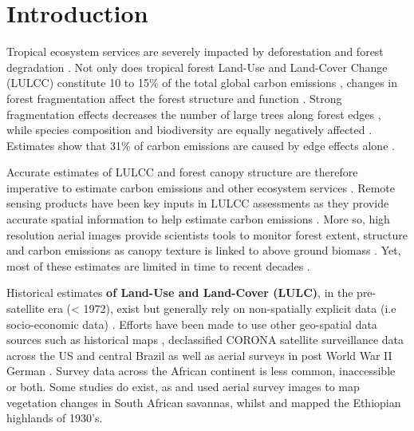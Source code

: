 \documentclass[remote sensing,article,submit,moreauthors,pdftex]{mdpi}
\begin{document}

\hypertarget{introduction}{%
\section{Introduction}\label{introduction}}

Tropical ecosystem services are severely impacted by deforestation and
forest degradation \citep{hansen2013, houghton2012, tyukavina2015}. Not
only does tropical forest Land-Use and Land-Cover Change (LULCC)
constitute 10 to 15\% of the total global carbon emissions
\citep{vanderwerf2009}, changes in forest fragmentation affect the
forest structure and function
\citep{fauset2017, brinck2017, didham1999}. Strong fragmentation effects
decreases the number of large trees along forest edges
\citep{laurance2000, magnago2015}, while species composition and
biodiversity are equally negatively affected
\citep{poorter2006, barlow2016, vandeperre2018}. Estimates show that
31\% of carbon emissions are caused by edge effects alone
\citep{brinck2017}.

Accurate estimates of LULCC and forest canopy structure are therefore
imperative to estimate carbon emissions and other ecosystem services
\citep{houghton2012, hansen2013}. Remote sensing products have been key
inputs in LULCC assessments as they provide accurate spatial information
to help estimate carbon emissions \citep{mitchard2018, hansen2013}. More
so, high resolution aerial images provide scientists tools to monitor
forest extent, structure and carbon emissions as canopy texture is
linked to above ground biomass
\citep{Ploton2012, Couteron2005, Barbier2010}. Yet, most of these
estimates are limited in time to recent decades
\citep{defries2002, houghton2012, hansen2013, achard2014}.

Historical estimates \textbf{of Land-Use and Land-Cover (LULC)}, in the
pre-satellite era (\textless{} 1972), exist but generally rely on
non-spatially explicit data (i.e socio-economic data)
\citep{houghton2012, ramankutty1999, defries2002, sader1988}. Efforts
have been made to use other geo-spatial data sources such as historical
maps \citep{willcock2016}, declassified CORONA satellite surveillance
data across the US and central Brazil \citep{song2015} as well as aerial
surveys in post World War II German \citep{nita2018}. Survey data across
the African continent is less common, inaccessible or both. Some studies
do exist, as \citet{buitenwerf2012} and \citet{hudak1998} used aerial
survey images to map vegetation changes in South African savannas,
whilst \citet{frankl2015} and \citet{nyssen2016} mapped the Ethiopian
highlands of 1930's.
\end{document}
